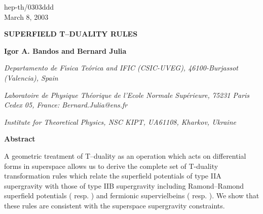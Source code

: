 \documentclass[a4paper,11pt]{article}
\begin{document}
\def\a{\alpha}\def\b{\beta}\def\g{\gamma}\def\d{\delta}\def\e{\epsilon }
\def\k{\kappa}\def\l{\lambda}\def\L{\Lambda}\def\s{\sigma}\def\S{\Sigma}
\def\Th{\Theta}\def\th{\theta}\def\om{\omega}\def\Om{\Omega}\def\G{\Gamma}
\def\y{\vartheta}\def\m{\mu}\def\n{\nu}
\renewcommand\baselinestretch{1.2}
\providecommand{\nn}{\nonumber\\}\providecommand{\p}[1]{(\ref{#1})}
\renewcommand{\thefootnote}{\fnsymbol{footnote}}
\thispagestyle{empty} 
\begin{flushright}
hep-th/0303ddd 
\\ March 8, 2003
\end{flushright}

\vspace{3cm}

\begin{center}

{\Large\bf SUPERFIELD T--DUALITY  RULES}




\vspace{0.2cm}
{\bf Igor A. Bandos \myHighlight{$^\dagger{}^\ast$}\coordHE{} and Bernard Julia \myHighlight{$^\ddagger$}\coordHE{}} 

\vspace{0.5cm}
{\it \myHighlight{$^\dagger$}\coordHE{}Departamento de F\'{\i}sica Te\'orica and IFIC 
(CSIC-UVEG), 
 46100-Burjassot (Valencia), Spain}


\vspace{0.5cm}
{\it \myHighlight{$^\ddagger$}\coordHE{} Laboratoire de Physique Th\'eorique de l'Ecole Normale 
Sup\'erieure, 75231 Paris Cedex 05, France: Bernard.Julia@ens.fr}

\vspace{0.5cm}
{\it \myHighlight{$^\ast$}\coordHE{}Institute for Theoretical Physics, NSC KIPT, 
UA61108,
Kharkov, Ukraine}  


\vspace{3.0cm}

{\bf Abstract}
\end{center}

A geometric treatment of T--duality as an operation which 
acts on differential forms in superspace 
allows us to derive 
the complete set of T-duality transformation rules which relate
the superfield potentials of \coordHE{} type IIA supergravity with those of type 
IIB supergravity including Ramond--Ramond superfield potentials
(\coordHE{} resp. \coordHE{}) and 
fermionic supervielbeins (\coordHE{} resp. 
\coordHE{}). We show that these 
rules are consistent with the superspace supergravity constraints.     
\end{document}
